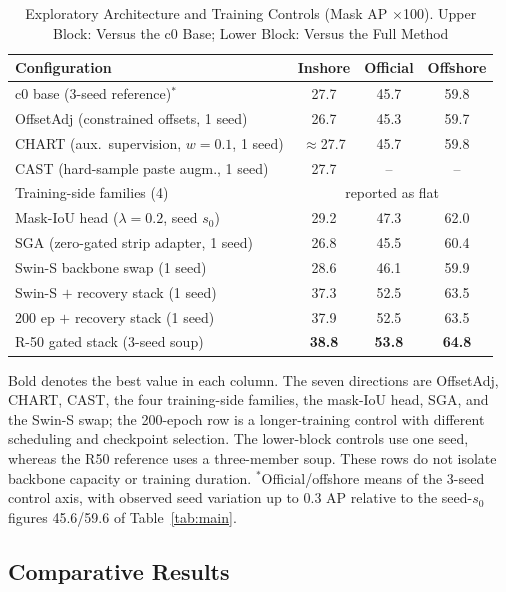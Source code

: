 \begin{table}[!t]
\caption{Exploratory Architecture and Training Controls (Mask AP $\times$100). Upper Block: Versus the c0 Base; Lower Block: Versus the Full Method}
\label{tab:arch}
\centering
\setlength{\tabcolsep}{4pt}
\begin{tabular}{lccc}
\toprule
Configuration & Inshore & Official & Offshore \\
\midrule
c0 base (3-seed reference)$^{\ast}$ & 27.7 & 45.7 & 59.8 \\
OffsetAdj (constrained offsets, 1 seed) & 26.7 & 45.3 & 59.7 \\
CHART (aux.\ supervision, $w{=}0.1$, 1 seed) & $\approx$27.7 & 45.7 & 59.8 \\
CAST (hard-sample paste augm., 1 seed) & 27.7 & -- & -- \\
Training-side families (4) & \multicolumn{3}{c}{reported as flat} \\
Mask-IoU head ($\lambda{=}0.2$, seed $s_0$) & 29.2 & 47.3 & 62.0 \\
SGA (zero-gated strip adapter, 1 seed) & 26.8 & 45.5 & 60.4 \\
Swin-S backbone swap (1 seed) & 28.6 & 46.1 & 59.9 \\
\midrule
Swin-S $+$ recovery stack (1 seed) & 37.3 & 52.5 & 63.5 \\
200 ep $+$ recovery stack (1 seed) & 37.9 & 52.5 & 63.5 \\
R-50 gated stack (3-seed soup) & \textbf{38.8} & \textbf{53.8} & \textbf{64.8} \\
\bottomrule
\end{tabular}
\par\vspace{2pt}
\parbox{\columnwidth}{\footnotesize Bold denotes the best value in each column. The seven directions are OffsetAdj, CHART, CAST, the four training-side families, the mask-IoU head, SGA, and the Swin-S swap; the 200-epoch row is a longer-training control with different scheduling and checkpoint selection. The lower-block controls use one seed, whereas the R50 reference uses a three-member soup. These rows do not isolate backbone capacity or training duration. $^{\ast}$Official/offshore means of the 3-seed control axis, with observed seed variation up to 0.3 AP relative to the seed-$s_0$ figures 45.6/59.6 of Table~\ref{tab:main}.}
\end{table}


\subsection{Comparative Results}\label{sec:exp:sota}


